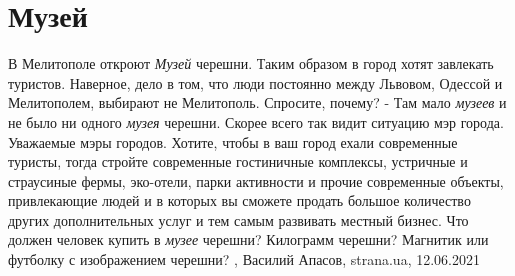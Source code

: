  
 
 
 
 
\chapter{Музей}
\label{sec:slova.muzej}

В Мелитополе откроют \emph{Музей} черешни.  Таким образом в город хотят
завлекать туристов.  Наверное, дело в том, что люди постоянно между Львовом,
Одессой и Мелитополем, выбирают не Мелитополь. Спросите, почему? - Там мало
\emph{музеев} и не было ни одного \emph{музея} черешни. Скорее всего так видит
ситуацию мэр города.  Уважаемые мэры городов. Хотите, чтобы в ваш город ехали
современные туристы, тогда стройте современные гостиничные комплексы, устричные
и страусиные фермы, эко-отели, парки активности и прочие современные объекты,
привлекающие людей и в которых вы сможете продать большое количество других
дополнительных услуг и тем самым развивать местный бизнес.  Что должен человек
купить в \emph{музее} черешни? Килограмм черешни? Магнитик или футболку с
изображением черешни?
, Василий Апасов, strana.ua, 12.06.2021 

